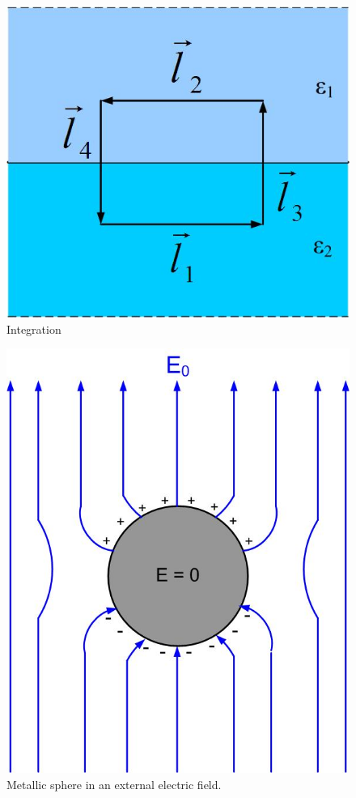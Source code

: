 \documentclass{ximera}
\begin{document}
\begin{figure}[htbp]
\begin{center}
\includegraphics[scale=0.5]{../jpg/integrationpathtangfield.jpg}
\end{center}
\caption{Integration}
\label{BoundaryCondition}
\end{figure}




\begin{figure}[htbp]
\begin{center}
\includegraphics[scale=0.5]{../jpg/metalsphereinefield.jpg}
\end{center}
\caption{Metallic sphere in an external electric field.}
\label{BoundaryConditionMetal}
\end{figure}
\end{document}
